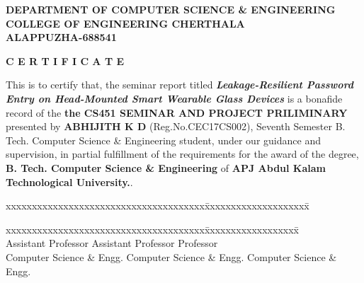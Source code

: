 \documentclass[12pt,a4paper,oneside]{report}
\begin{document}
\begin{titlepage}
\begin{center}

\large{\textbf{DEPARTMENT OF COMPUTER SCIENCE \& ENGINEERING}}\\
\large{\textbf{COLLEGE OF ENGINEERING CHERTHALA\\ALAPPUZHA-688541}}\\
\end{center}
\begin{figure}[h]
\begin{center}
\end{center}
\end{figure}
\begin{center}
\large{\textbf{C E R T I F I C A T E}}\\
\end{center}
\begin{spacing}{1.5}
This is to certify that, the seminar report titled  \textbf{\textit{ Leakage-Resilient Password Entry on Head-Mounted Smart Wearable Glass Devices}} is a bonafide record of the \textbf{the CS451 SEMINAR AND PROJECT PRILIMINARY} presented by \textbf{ABHIJITH K D} (Reg.No.CEC17CS002), Seventh Semester B. Tech. Computer Science \& Engineering  student,  under our guidance and supervision, in partial fulfillment of the requirements for the award of the degree, \textbf{B. Tech. Computer Science  \& Engineering } of \textbf{APJ Abdul Kalam Technological University.}.
\end{spacing}
\begin{tabbing}
xxxxxxxxxxxxxxxxxxxxxxxxxxxxxxxxxxxxxx\= xxxxxxxxxxxxxxxxxxxx\= \kill
\hspace{.15in}{\bf Guide} \>\hspace{-.7in}{\bf Co-ordinator}\hspace{1.32in}{\bf  HoD  } \\
\end{tabbing}
\begin{tabbing}
xxxxxxxxxxxxxxxxxxxxxxxxxxxxxxxxxxxxxx\= xxxxxxxxxxxxxxxxxx\= \kill
   \>\hspace{-.7in}{\bf Mrs. Janu R Panicker} \hspace{.65 in}{\bf Dr. Priya S}\\
\hspace{.15in}Assistant Professor    \>\hspace{-.7in}Assistant Professor\>\hspace{.05in} Professor\\
\hspace{.1in} Computer Science \& Engg.    \>\hspace{-.75in}    Computer Science \& Engg. \>\hspace{.035in}    Computer Science \& Engg.\\

\end{tabbing}
\end{titlepage}
\end{document}
